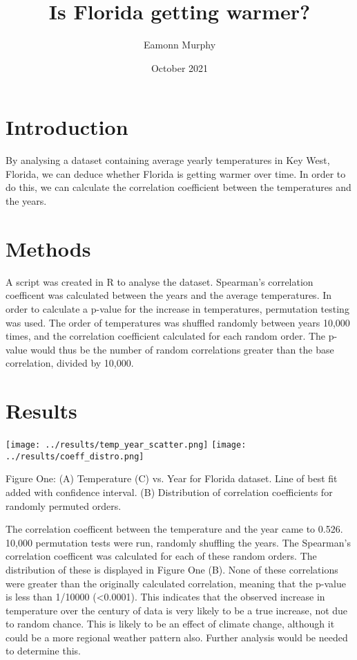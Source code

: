 \documentclass[10pt]{article}
\title{Is Florida getting warmer?}
\author{Eamonn Murphy}
\date{October 2021}
\begin{document}
\maketitle

\thispagestyle{empty}

\section{Introduction}
By analysing a dataset containing average yearly temperatures in Key West, 
Florida, we can deduce whether Florida is getting warmer over time. In order to 
do this, we can calculate the correlation coefficient between the temperatures 
and the years.

\section{Methods}
A script was created in R to analyse the dataset. Spearman's correlation 
coefficent was calculated between the years and the average temperatures. In 
order to calculate a p-value for the increase in temperatures, permutation testing
 was used. The order of temperatures was shuffled randomly between years 10,000 
 times, and the correlation coefficient calculated for each random order. The 
 p-value would thus be the number of random correlations greater than the base 
 correlation, divided by 10,000.

\section{Results}
\begin{center}
    \texttt{[image: ../results/temp\_year\_scatter.png]}
    \texttt{[image: ../results/coeff\_distro.png]}

    Figure One: (A) Temperature (C) vs. Year for Florida dataset. Line of best fit
    added with confidence interval. (B) Distribution of correlation coefficients
    for randomly permuted orders.
\end{center}

The correlation coefficent between the temperature and the year came to 0.526.
10,000 permutation tests were run, randomly shuffling the years. The Spearman's
correlation coefficent was calculated for each of these random orders. The
distribution of these is displayed in Figure One (B). None of these correlations 
were greater than the originally calculated correlation, meaning that the p-value 
is less than 1/10000 (<0.0001). This indicates that the observed increase in 
temperature over the century of data is very likely to be a true increase, not 
due to random chance. This is likely to be an effect of climate change, although
it could be a more regional weather pattern also. Further analysis would be needed 
to determine this.
\end{document}
